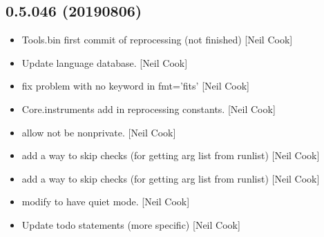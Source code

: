 \documentclass[a4paper,10pt,english]{report}
\begin{document}
\subsection{0.5.046 (2019\sphinxhyphen{}08\sphinxhyphen{}06)}
\label{\detokenize{misc/changelog:id115}}\begin{itemize}
\item {} 
Tools.bin \sphinxhyphen{} first commit of reprocessing (not finished) {[}Neil Cook{]}

\item {} 
Update language database. {[}Neil Cook{]}

\item {} 
 \sphinxhyphen{} fix problem with no  keyword in fmt=’fits’
{[}Neil Cook{]}

\item {} 
Core.instruments \sphinxhyphen{} add in reprocessing constants. {[}Neil Cook{]}

\item {} 
 \sphinxhyphen{} allow  not be non\sphinxhyphen{}private. {[}Neil
Cook{]}

\item {} 
 \sphinxhyphen{} add a way to skip checks (for getting arg
list from runlist) {[}Neil Cook{]}

\item {} 
 \sphinxhyphen{} add a way to skip checks (for getting arg
list from runlist) {[}Neil Cook{]}

\item {} 
 \sphinxhyphen{} modify  to have
quiet mode. {[}Neil Cook{]}

\item {} 
Update todo statements (more specific) {[}Neil Cook{]}

\end{itemize}
\end{document}
